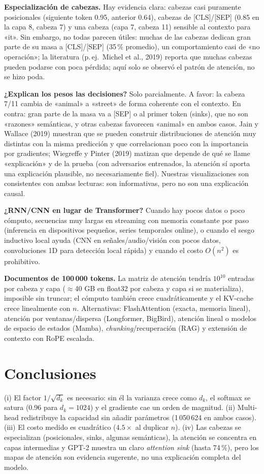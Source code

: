 \documentclass[10pt,letterpaper]{article}
\newcommand{\dk}{d_k}
\begin{document}
\textbf{Especialización de cabezas.} Hay evidencia clara: cabezas casi puramente posicionales (siguiente token 0.95, anterior 0.64), cabezas de [CLS]/[SEP] (0.85 en la capa 8, cabeza 7) y una cabeza (capa 7, cabeza 11) sensible al contexto para «it». Sin embargo, no todas parecen útiles: muchas de las cabezas dedican gran parte de su masa a [CLS]/[SEP] (35\,\% promedio), un comportamiento casi de «no operación»; la literatura (p.\,ej.\ Michel et al., 2019) reporta que muchas cabezas pueden podarse con poca pérdida; aquí solo se observó el patrón de atención, no se hizo poda.

\textbf{¿Explican los pesos las decisiones?} Solo parcialmente. A favor: la cabeza 7/11 cambia de «animal» a «street» de forma coherente con el contexto. En contra: gran parte de la masa va a [SEP] o al primer token (sinks), que no son «razones» semánticas, y otras cabezas favorecen «animal» en ambos casos. Jain y Wallace (2019) muestran que se pueden construir distribuciones de atención muy distintas con la misma predicción y que correlacionan poco con la importancia por gradientes; Wiegreffe y Pinter (2019) matizan que depende de qué se llame «explicación» y de la prueba (con adversarios entrenados, la atención sí aporta una explicación plausible, no necesariamente fiel). Nuestras visualizaciones son consistentes con ambas lecturas: son informativas, pero no son una explicación causal.

\textbf{¿RNN/CNN en lugar de Transformer?} Cuando hay pocos datos o poco cómputo, secuencias muy largas en streaming con memoria constante por paso (inferencia en dispositivos pequeños, series temporales online), o cuando el sesgo inductivo local ayuda (CNN en señales/audio/visión con pocos datos, convoluciones 1D para detección local rápida) y cuando el costo $O(n^2)$ es prohibitivo.

\textbf{Documentos de 100\,000 tokens.} La matriz de atención tendría $10^{10}$ entradas por cabeza y capa ($\approx$40 GB en float32 por cabeza y capa si se materializa), imposible sin truncar; el cómputo también crece cuadráticamente y el KV-cache crece linealmente con $n$. Alternativas: FlashAttention (exacta, memoria lineal), atención por ventanas/dispersa (Longformer, BigBird), atención lineal o modelos de espacio de estados (Mamba), \emph{chunking}/recuperación (RAG) y extensión de contexto con RoPE escalada.

\section{Conclusiones}
(i) El factor $1/\sqrt{\dk}$ es necesario: sin él la varianza crece como $\dk$, el softmax se satura (0.96 para $\dk=1024$) y el gradiente cae un orden de magnitud. (ii) Multi-head redistribuye la capacidad sin añadir parámetros (1\,050\,624 en ambos casos). (iii) El costo medido es cuadrático ($4.5\times$ al duplicar $n$). (iv) Las cabezas se especializan (posicionales, sinks, algunas semánticas), la atención se concentra en capas intermedias y GPT-2 muestra un claro \emph{attention sink} (hasta 74\,\%), pero los mapas de atención son evidencia sugerente, no una explicación completa del modelo.
\end{document}
